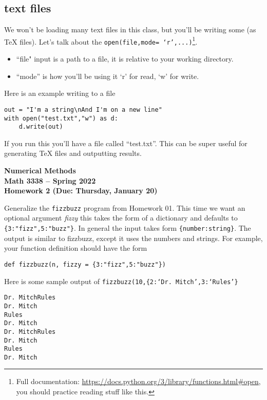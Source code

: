 \documentclass[11pt,letterpaper]{article}
\newcommand{\semester}{Spring 2022}
\newcommand{\due}{Thursday, January 20}
\begin{document}
\subsection{text files}
We won't be loading many text files in this class, but you'll be writing some (as TeX files). Let's talk about the \texttt{open(file,mode= `r',...)}\footnote{Full documentation: \url{https://docs.python.org/3/library/functions.html\#open}, you should practice reading stuff like this.}. 
\begin{itemize}
 \item ``file" input is a path to a file, it is relative to your working directory. 
 \item ``mode'' is how you'll be using it `r' for read, `w' for write. 
\end{itemize}
Here is an example writing to a file
\begin{verbatim}
out = "I'm a string\nAnd I'm on a new line"
with open("test.txt","w") as d:
    d.write(out)
\end{verbatim}
If you run this you'll have a file called ``test.txt''. This can be super useful for generating TeX files and outputting results. 


\newpage

\begin{center}
{\huge{\bf  Numerical Methods}} \\[1.5ex]
{\bf Math 3338 -- \semester}\\[1.5ex]
{\Large{\bf Homework 2 (Due: \due)}}\\
\end{center}
\vspace{2mm}


\begin{problem}
Generalize the \texttt{fizzbuzz} program from Homework 01. This time we want an optional argument
\emph{fizzy} this takes the form of a dictionary and defaults to \texttt{\{3:"fizz",5:"buzz"\}}. 
In general the input takes form \texttt{\{number:string\}}. The output is similar to fizzbuzz, except
it uses the numbers and strings. For example, your function definition should have the form
\begin{verbatim}
def fizzbuzz(n, fizzy = {3:"fizz",5:"buzz"})
\end{verbatim}

Here is some sample output of \texttt{fizzbuzz(10,\{2:`Dr. Mitch',3:`Rules'\}}
\begin{verbatim}
Dr. MitchRules
Dr. Mitch
Rules
Dr. Mitch
Dr. MitchRules
Dr. Mitch
Rules
Dr. Mitch
\end{verbatim}

\end{problem}
\end{document}
